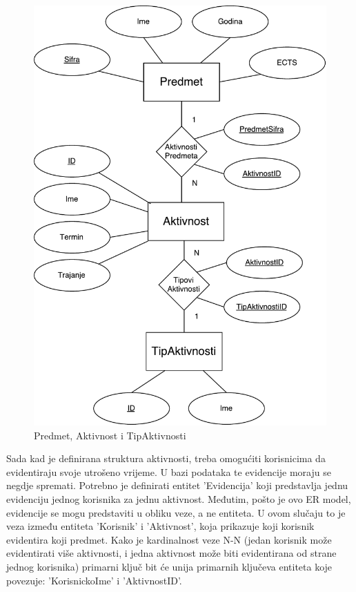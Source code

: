 \documentclass[times, utf8, zavrsni]{fer}
\begin{document}
\begin{figure}[H]
\centering
\includegraphics[width=\textwidth,height=\textheight,keepaspectratio]{img/predmet-aktivnost-tip.pdf}
\caption{Predmet, Aktivnost i TipAktivnosti}
\label{fig:predmet-aktivnost-tip}
\end{figure}

Sada kad je definirana struktura aktivnosti, treba omogućiti korisnicima da evidentiraju svoje utrošeno vrijeme. U bazi podataka te evidencije moraju se negdje spremati. Potrebno je definirati entitet 'Evidencija' koji predstavlja jednu evidenciju jednog korisnika za jednu aktivnost. Međutim, pošto je ovo ER model, evidencije se mogu predstaviti u obliku veze, a ne entiteta. U ovom slučaju to je veza između entiteta 'Korisnik' i 'Aktivnost', koja prikazuje koji korisnik evidentira koji predmet. Kako je kardinalnost veze N-N (jedan korisnik može evidentirati više aktivnosti, i jedna aktivnost može biti evidentirana od strane jednog korisnika) primarni ključ bit će unija primarnih ključeva entiteta koje povezuje: 'KorisnickoIme' i 'AktivnostID'.\\
\end{document}
